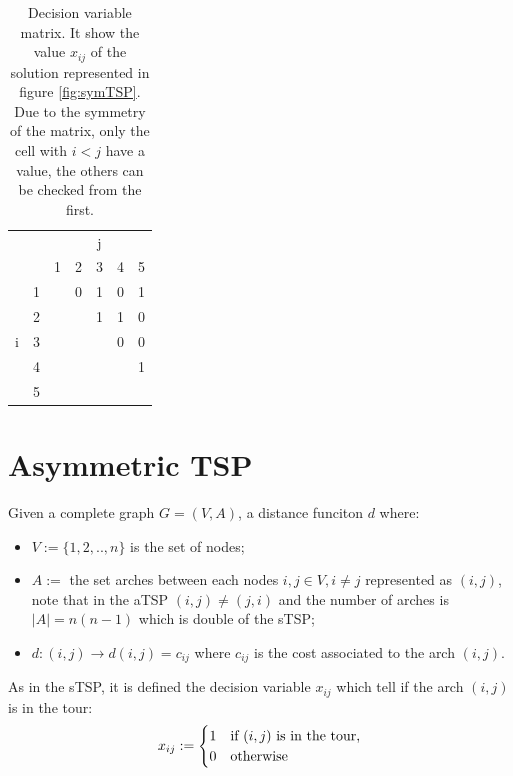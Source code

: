 \begin{table}[h!]
	\begin{center}
		\caption{Decision variable matrix. It show the value $ x_{ij} $ of the solution represented in figure \ref{fig:symTSP}. Due to the symmetry of the matrix, only the cell with $ i < j $ have a value, the others can be checked from the first.}
		\label{tab:symTSP_solution}
		\begin{tabular}{cc|c|c|c|c|c|}
			 \multicolumn{2}{c}{} & \multicolumn{5}{c}{j} \\ %
			& \multicolumn{1}{c}{} & \multicolumn{1}{c}{1} & \multicolumn{1}{c}{2} & \multicolumn{1}{c}{3} & \multicolumn{1}{c}{4} & \multicolumn{1}{c}{5} \\ \cline{3-7}
			\multirow{5}{*}{i} 	& 1 & \cellcolor{Black} & 0 & 1 & 0 & 1 \\ \cline{3-7}
								& 2 &  & \cellcolor{Black} & 1 & 1 & 0 \\ \cline{3-7}
								& 3 &  &  & \cellcolor{Black} & 0 & 0 \\ \cline{3-7}
								& 4 &  &  &  & \cellcolor{Black} & 1 \\ \cline{3-7}
								& 5 &  &  &  &  & \cellcolor{Black} \\ \cline{3-7}
		\end{tabular}
	\end{center}
\end{table}



\section{Asymmetric TSP}
Given a complete graph $ G = (V,A) $, a distance funciton  $ d $ where:
\begin{itemize}
	\item $ V:= \{1, 2, .., n\} $ is the set of nodes;
	\item $ A := $ the set arches between each nodes $ i,j \in V, i \ne j$ represented as $ (i,j) $, note that in the aTSP $ (i,j) \ne (j,i) $ and the number of arches is $ |A| = n (n-1) $ which is double of the sTSP;
	\item $ d: (i,j) \rightarrow d(i,j) = c_{ij} $ where $ c_{ij} $ is the cost associated to the arch $ (i,j) $.
\end{itemize}
As in the sTSP, it is defined the decision variable $ x_{ij} $ which tell if the arch $ (i,j) $ is in the tour:
\[
x_{ij} := \begin{cases}
1 & \text{if $ (i,j) $ is in the tour,} \\
0 & \text{otherwise}
\end{cases}
\]

